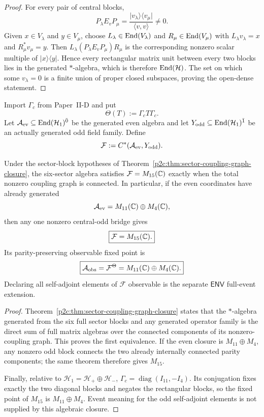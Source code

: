 \documentclass[12pt,a4paper]{article}
\begin{document}
\begin{proof}
For every pair of central blocks,
\[
 P_\lambda E_vP_\mu
 =\frac{\lvert v_\lambda\rangle\langle v_\mu\rvert}
 {\langle v,v\rangle}\ne0.
\]
Given \(x\in V_\lambda\) and \(y\in V_\mu\), choose
\(L_\lambda\in\operatorname{End}(V_\lambda)\) and
\(R_\mu\in\operatorname{End}(V_\mu)\) with
\(L_\lambda v_\lambda=x\) and \(R_\mu^*v_\mu=y\).  Then
\(L_\lambda(P_\lambda E_vP_\mu)R_\mu\) is the corresponding nonzero
scalar multiple of \(\lvert x\rangle\langle y\rvert\).  Hence every
rectangular matrix unit between every two blocks lies in the generated
\(*\)-algebra, which is therefore \(\operatorname{End}(\mathcal H)\).  The set on which
some \(v_\lambda=0\) is a finite union of proper closed subspaces, proving
the open-dense statement.
\end{proof}

\begin{definition}
\label{p4:def:graded-field-envelope}
Import \(\Gamma_c\) from Paper~II-D and put
\[
 \Theta(T):=\Gamma_cT\Gamma_c.
\]
Let \(\mathcal A_{\rm ev}\subseteq
\operatorname{End}(\mathcal H_1)^{\bar0}\) be the generated even algebra and let
\(Y_{\rm odd}\subseteq\operatorname{End}(\mathcal H_1)^{\bar1}\) be an actually generated
odd field family.  Define
\[
 \mathcal F:=C^*(\mathcal A_{\rm ev},Y_{\rm odd}).
\]
\end{definition}

\begin{theorem}
\label{p4:thm:odd-bridge-field-envelope}
Under the sector-block hypotheses of
Theorem~\ref{p2c:thm:sector-coupling-graph-closure}, the six-sector algebra
satisfies \(\mathcal F=M_{15}(\mathbb{C})\) exactly when the total nonzero coupling
graph is connected.  In particular, if the even coordinates have already
generated
\[
 \mathcal A_{\rm ev}=M_{11}(\mathbb{C})\oplus M_4(\mathbb{C}),
\]
then any one nonzero central-odd bridge gives
\[
 \boxed{\mathcal F=M_{15}(\mathbb{C}).}
\]
Its parity-preserving observable fixed point is
\[
 \boxed{\mathcal A_{\rm obs}=\mathcal F^\Theta
 =M_{11}(\mathbb{C})\oplus M_4(\mathbb{C}).}
\]
Declaring all self-adjoint elements of \(\mathcal F\) observable is the
separate \(\mathsf{ENV}\) full-event extension.
\end{theorem}

\begin{proof}
Theorem~\ref{p2c:thm:sector-coupling-graph-closure} states that the
\(*\)-algebra generated from the six full sector blocks and any generated
operator family is the direct sum of full matrix algebras over the connected
components of its nonzero-coupling graph.  This proves the first equivalence.
If the even closure is \(M_{11}\oplus M_4\), any nonzero odd block connects
the two already internally connected parity components; the same theorem
therefore gives \(M_{15}\).

Finally, relative to
\(\mathcal H_1=\mathcal H_+\oplus\mathcal H_-\),
\(\Gamma_c=\operatorname{diag}(I_{11},-I_4)\).  Its conjugation fixes exactly
the two diagonal blocks and negates the rectangular blocks, so the fixed
point of \(M_{15}\) is \(M_{11}\oplus M_4\).  Event meaning for the odd
self-adjoint elements is not supplied by this algebraic closure.
\end{proof}
\end{document}
